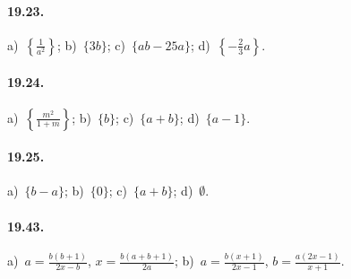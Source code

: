 \paragraph{19.23.} %
a)~$\left\{\frac{1}{a^{2}}\right\}$; \quad b)~$\{3b\}$; \quad c)~$\{ab-25a\}$; \quad d)~$\left\{-\frac{2}{3}a\right\}$.

\paragraph{19.24.} %
a)~$\left\{\frac{m^{2}}{1+m}\right\}$; \quad b)~$\{b\}$; \quad c)~$\{a+b\}$; \quad d)~$\{a-1\}$.

\paragraph{19.25.} %
a)~$\{b-a\}$; \quad b)~$\{0\}$; \quad c)~$\{a+b\}$; \quad d)~$\emptyset$.

\paragraph{19.43.}
a)~$a=\frac{b(b+1)}{2x-b}$, $x=\frac{b(a+b+1)}{2a}$;
\quad b)~$a=\frac{b(x+1)}{2x-1}$, $b=\frac{a(2x-1)}{x+1}$.
